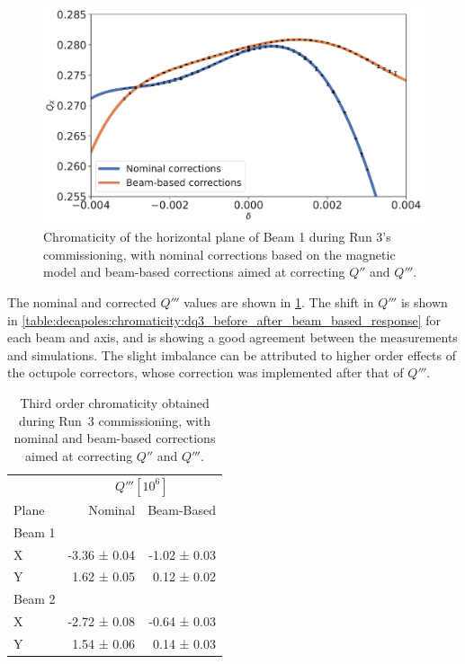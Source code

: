 \begin{figure}[!htb]
    \centering
    \includegraphics[width=0.8\columnwidth]{images/nominal_vs_beam_based_corrections.pdf}
    \caption{Chromaticity of the horizontal plane of Beam 1 during Run 3's commissioning, with
    nominal corrections based on the magnetic model and beam-based corrections aimed at correcting
     $Q''$ and $Q'''$.}
    \label{figure:decapoles:chromaticity:dq3_comparison}
\end{figure}

The nominal and corrected $Q'''$ values are shown in
\cref{table:decapoles:chromaticity:dq3_before_after_beam_based}. The shift in $Q'''$ is shown in 
\cref{table:decapoles:chromaticity:dq3_before_after_beam_based_response} for
each beam and axis, and is showing a good agreement between the measurements and simulations.
The slight imbalance can be attributed to higher order effects of the octupole correctors, whose
correction was implemented after that of $Q'''$.

\begin{table}[!htb]
    \centering
    \begin{tabular}{lrr}
      \toprule
              &  \multicolumn{2}{c}{$Q''' [10^6]$}  \\
        Plane & Nominal & Beam-Based \\
      \midrule
        Beam 1    &   & \\
        \hspace{2mm}X     &  -3.36 ± 0.04 &  -1.02 ± 0.03 \\
        \hspace{2mm}Y     &   1.62 ± 0.05 &   0.12 ± 0.02 \\
        Beam 2    &           &               \\
        \hspace{2mm}X     &  -2.72 ± 0.08 &  -0.64 ± 0.03 \\
        \hspace{2mm}Y     &   1.54 ± 0.06 &   0.14 ± 0.03 \\
        \bottomrule
    \end{tabular}
    \caption{Third order chromaticity obtained during Run~3 commissioning, with nominal and
    beam-based corrections aimed at correcting $Q''$ and $Q'''$.}
    \label{table:decapoles:chromaticity:dq3_before_after_beam_based}
  \end{table}
  
